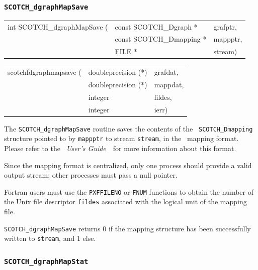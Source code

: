 \subsubsection{{\tt SCOTCH\_dgraphMapSave}}

\begin{itemize}
\progsyn

{\tt\begin{tabular}{l@{}ll}
int SCOTCH\_dgraphMapSave ( & const SCOTCH\_Dgraph *   & grafptr, \\
                            & const SCOTCH\_Dmapping * & mappptr, \\
                            & FILE *                   & stream)
\end{tabular}}

{\tt\begin{tabular}{l@{}ll}
scotchfdgraphmapsave ( & doubleprecision (*) & grafdat, \\
                       & doubleprecision (*) & mappdat, \\
                       & integer             & fildes,  \\
                       & integer             & ierr)
\end{tabular}}

\progdes

The {\tt SCOTCH\_dgraphMapSave} routine saves the contents of the {\tt
SCOTCH\_\lbt Dmapping} structure pointed to by {\tt mappptr} to stream
{\tt stream}, in the \scotch\ mapping format. Please refer to the
{\it\scotch\ User's Guide}~\scotchcitesuser\ for more information about
this format.

Since the mapping format is centralized, only one process should
provide a valid output stream; other processes must pass a null
pointer.

Fortran users must use the {\tt PXFFILENO} or {\tt FNUM} functions to
obtain the number of the Unix file descriptor {\tt fildes} associated
with the logical unit of the mapping file.

\progret

{\tt SCOTCH\_dgraphMapSave} returns $0$ if the mapping structure
has been successfully written to {\tt stream}, and $1$ else.
\end{itemize}

\subsubsection{{\tt SCOTCH\_dgraphMapStat}}
\label{sec-lib-func-dgraphmapstat}

